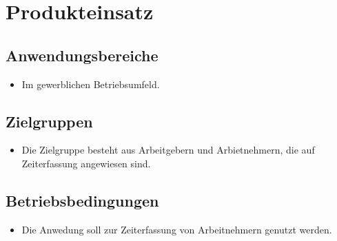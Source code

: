 \section{Produkteinsatz}

\subsection{Anwendungsbereiche}
\begin{itemize}
	\item Im gewerblichen Betriebsumfeld.
\end{itemize}


\subsection{Zielgruppen}
\begin{itemize}
	\item Die Zielgruppe besteht aus Arbeitgebern und Arbietnehmern, die auf Zeiterfassung angewiesen sind.
\end{itemize}

\subsection{Betriebsbedingungen}
\begin{itemize}
	\item Die Anwedung soll zur Zeiterfassung von Arbeitnehmern genutzt werden.
\end{itemize}